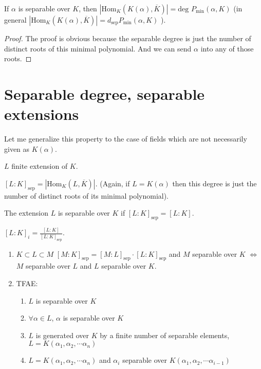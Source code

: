 \begin{proposition}
If $\alpha$ is separable over $K$, then $|\text{Hom}_K(K(\alpha),\overbar{K})|=\text{deg }P_{\text{min}}(\alpha,K)$ (in general $|\text{Hom}_K(K(\alpha),\overbar{K})|=d_{\text{sep}}P_{\text{min}}(\alpha,K)$ ). 
\end{proposition}

\begin{proof}
The proof is obvious because the separable degree is just the number of distinct roots of this minimal polynomial. And we can send $\alpha$
into any of those roots.
\end{proof}

\section{Separable degree, separable extensions}

Let me generalize this property to the case of fields which are not necessarily given as $K(\alpha)$. 

$L$ finite extension of $K$. 
\begin{definition}
$[L:K]_{\text{sep}}=|\text{Hom}_K(L,\overbar{K})|$. (Again, if $L=K(\alpha)$ then this degree is just the number of distinct roots of its minimal polynomial).

The extension $L$ is separable over $K$ if $[L:K]_{\text{sep}}=[L:K]$.

$[L:K]_i=\frac{[L:K]}{[L:K]_{\text{sep}}}$.
\end{definition}

\begin{theorem}
\begin{enumerate}
\item $K\subset L\subset M$ $[M:K]_{\text{sep}} = [M:L]_{\text{sep}}\cdot [L:K]_{\text{sep}}$ and $M$ separable over $K$ $\iff$ $M$ separable over $L$ and $L$ separable over $K$.
\item TFAE:
\begin{enumerate}
\item $L$ is separable over $K$ 
\item $\forall \alpha \in L$, $\alpha$ is separable over $K$
\item $L$ is generated over $K$ by a finite number of separable elements, $L=K(\alpha_1,\alpha_2,\cdots\alpha_n)$
\item $L=K(\alpha_1,\alpha_2,\cdots\alpha_n)$ and $\alpha_i$ separable over $K(\alpha_1,\alpha_2,\cdots\alpha_{i-1})$
\end{enumerate}
\end{enumerate}
\end{theorem}

